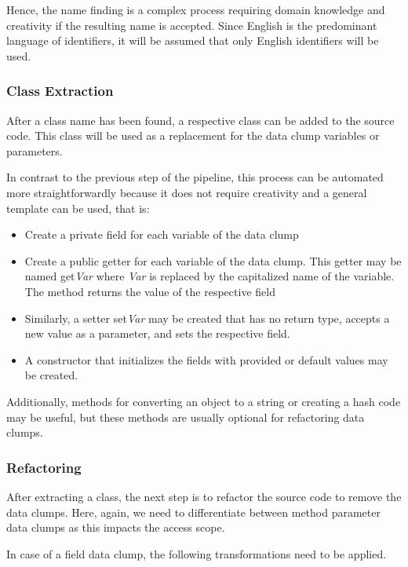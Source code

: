 Hence, the name finding is a complex process requiring domain knowledge and creativity if the resulting name is accepted. 
Since English is the predominant language of identifiers, it will be assumed that only English identifiers will be used. 


\subsubsection{Class Extraction}\label{subsec:chap3_data_class_extraction}
After a class name has been found, a respective class can be added to the source code. This class will be used as a replacement for the data clump variables or parameters. 

In contrast to the previous step of the pipeline, this process can be automated more straightforwardly because it does not require creativity and a general template can be used, that is:
\begin{itemize}
    \item Create a private field for each variable of the data clump
    \item Create a public getter for each variable of the data clump. This getter may be named get\textit{Var} where \textit{Var} is replaced by the capitalized name of the variable. The method returns the value of the respective field
    \item Similarly, a setter set\textit{Var} may be created that has no return type, accepts a new value as a parameter, and sets the respective field. 
    \item A constructor that initializes the fields with provided or default values may be created. 
\end{itemize}

Additionally, methods for converting an object to a string or creating a hash code may be useful, but these methods are usually optional for refactoring data clumps. 


\subsubsection{Refactoring}
After extracting a class, the next step is to refactor the source code to remove the data clumps. Here, again, we need to differentiate between method parameter data clumps as this impacts the access scope. 

In case of a field data clump, the following transformations need to be applied.

